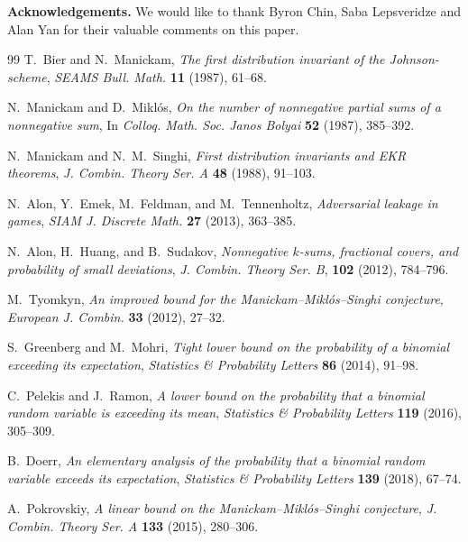 \documentclass[11pt]{amsart}
\theoremstyle{definition}
\begin{document}
\medskip
\textbf{Acknowledgements.} We would like to thank Byron Chin, Saba Lepsveridze and Alan Yan for their valuable comments on this paper.

\begin{thebibliography}{99}
T.~Bier and N.~Manickam,
\emph{The first distribution invariant of the Johnson-scheme},
\emph{SEAMS Bull. Math.} \textbf{11} (1987), 61--68.

N.~Manickam and D.~Mikl\'os,
\emph{On the number of nonnegative partial sums of a nonnegative sum},
In \emph{Colloq. Math. Soc. Janos Bolyai} \textbf{52} (1987), 385--392.

N.~Manickam and N.~M.~Singhi,
\emph{First distribution invariants and EKR theorems},
\emph{J. Combin. Theory Ser. A} \textbf{48} (1988), 91--103.

N.~Alon, Y.~Emek, M.~Feldman, and M.~Tennenholtz,
\emph{Adversarial leakage in games},
\emph{SIAM J. Discrete Math.} \textbf{27} (2013), 363--385.

N.~Alon, H.~Huang, and B.~Sudakov,
\emph{Nonnegative $k$-sums, fractional covers, and probability of small deviations},
\emph{J. Combin. Theory Ser. B}, \textbf{102} (2012), 784--796.

M.~Tyomkyn,
\emph{An improved bound for the Manickam--Mikl\'os--Singhi conjecture},
\emph{European J. Combin.} \textbf{33} (2012), 27--32.

S.~Greenberg and M.~Mohri,
\emph{Tight lower bound on the probability of a binomial exceeding its expectation},
\emph{Statistics \& Probability Letters} \textbf{86} (2014), 91--98.

C.~Pelekis and J.~Ramon,
\emph{A lower bound on the probability that a binomial random variable is exceeding its mean},
\emph{Statistics \& Probability Letters} \textbf{119} (2016), 305--309.

B.~Doerr,
\emph{An elementary analysis of the probability that a binomial random variable exceeds its expectation},
\emph{Statistics \& Probability Letters} \textbf{139} (2018), 67--74.

A.~Pokrovskiy,
\emph{A linear bound on the Manickam--Mikl\'os--Singhi conjecture},
\emph{J. Combin. Theory Ser. A} \textbf{133} (2015), 280--306.

\end{thebibliography}
\end{document}
